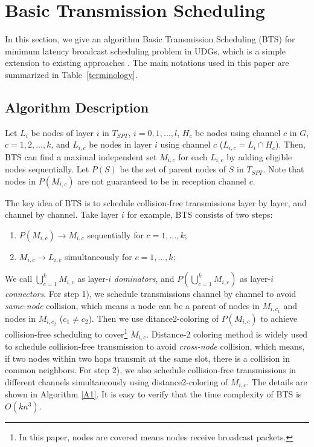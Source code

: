 \documentclass[10pt, conference]{IEEEtran}
\begin{document}
\section{Basic Transmission Scheduling} \label{bts}
In this section, we give an algorithm Basic Transmission
Scheduling (BTS) for minimum latency broadcast scheduling
problem in UDGs, which is a simple extension to existing
approaches \cite{info07, ICC09}. The main notations used in
this paper are summarized in Table~\ref{terminology}.

\subsection{Algorithm Description}


Let $L_i$ be nodes of layer $i$ in $T_{SPT}$, $i = 0, 1, ...,
l$, $H_c$ be nodes using channel $c$ in $G$, $c = 1,2, ..., k$,
and $L_{i,c}$ be nodes in layer $i$ using channel $c$ ($L_{i,c}
= L_{i} \cap H_c$). Then, BTS can find a maximal independent set
$M_{i,c}$ for each $L_{i,c}$ by adding eligible nodes
sequentially. Let $P(S)$ be the set of parent nodes of $S$ in
$T_{SPT}$. Note that nodes in $P(M_{i,c})$ are not guaranteed
to be in reception channel $c$.

The key idea of BTS is to schedule collision-free
transmissions layer by layer, and channel by channel.
Take layer $i$ for example, BTS consists of two
steps:
\begin{enumerate}
\item $P(M_{i,c}) \rightarrow M_{i,c}$ sequentially for $c =
    1,...,k$;
\item $ M_{i,c} \rightarrow  L_{i,c}$ simultaneously for $c
    = 1,...,k$;
\end{enumerate}

We call $\bigcup_{c=1}^k M_{i,c}$ as layer-$i$
\emph{dominators}, and $P(\bigcup_{c=1}^k M_{i,c})$ as
layer-$i$ \emph{connectors}. For step 1), we schedule
transmissions channel by channel to avoid \emph{same-node}
collision, which means a node can be a parent of nodes in
$M_{i,c_1}$ and nodes in $M_{i, c_2}$ ($c_1 \neq c_2$). Then we
use ditance2-coloring of $P(M_{i,c})$ to achieve collision-free
scheduling to cover\footnote{In this paper, nodes are covered
means nodes receive broadcast packets.} $M_{i, c}$. Distance-2
coloring method is widely used to schedule collision-free
transmission to avoid \emph{cross-node} collision, which means, if
two nodes within two hops transmit at the same slot, there is a
collision in common neighbors. For step 2), we also schedule
collision-free transmissions in different channels
simultaneously using distance2-coloring of $M_{i,c}$. The
details are shown in Algorithm \ref{A1}. It is easy to verify
that the time complexity of BTS is $O(k n^3)$.
\end{document}
